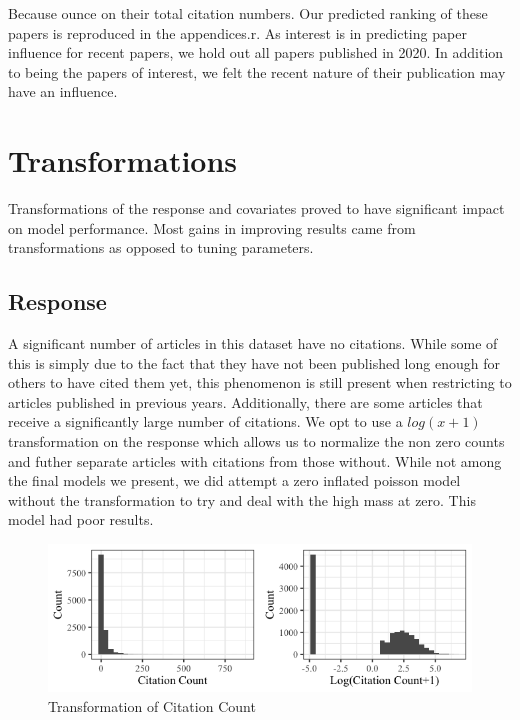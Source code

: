 \documentclass{article} %
\begin{document}
Because ounce on their total citation numbers. Our predicted ranking of these papers is reproduced in the appendices.r. As interest is in predicting paper influence for recent papers, we hold out all papers published in 2020. In addition to being the papers of interest, we felt the recent nature of their publication may have an influence.



\section{Transformations}
\label{others}

Transformations of the response and covariates proved to have significant impact on model performance. Most gains in improving results came from transformations as opposed to tuning parameters.

\subsection{Response}
A significant number of articles in this dataset have no citations. While some of this is simply due to the fact that they have not been published long enough for others to have cited them yet, this phenomenon is still present when restricting to articles published in previous years. Additionally, there are some articles that receive a significantly large number of citations. We opt to use a $log(x+1)$ transformation on the response which allows us to normalize the non zero counts and futher separate articles with citations from those without. While not among the final models we present, we did attempt a zero inflated poisson model without the transformation to try and deal with the high mass at zero. This model had poor results.


\begin{figure}[h]
\begin{center}
\includegraphics[scale=0.5]{../Figures/citation_hist.png} 
\end{center}
\caption{Transformation of Citation Count}
\end{figure}
\end{document}
